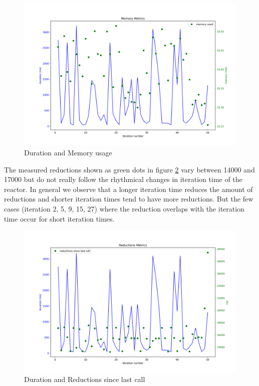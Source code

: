 \documentclass[a4paper]{book}
\begin{document}
\begin{figure}[htb!]
	\includegraphics[width=\textwidth]{dura_mt}
	\caption{Duration and Memory usage}
	\label{fig:dura_mt}
\end{figure}

The measured reductions shown as green dots in figure \ref{fig:dura_rslc} vary between 14000 and 17000 but do not really follow the rhythmical changes in iteration time of the reactor. In general we observe that a longer iteration time reduces the amount of reductions and shorter iteration times tend to have more reductions. But the few cases (iteration 2, 5, 9, 15, 27) where the reduction overlaps with the iteration time occur for short iteration times.

\begin{figure}[htb!]
	\includegraphics[width=\textwidth]{dura_rslc}
	\caption{Duration and Reductions since last call}
	\label{fig:dura_rslc}
\end{figure}
\end{document}
